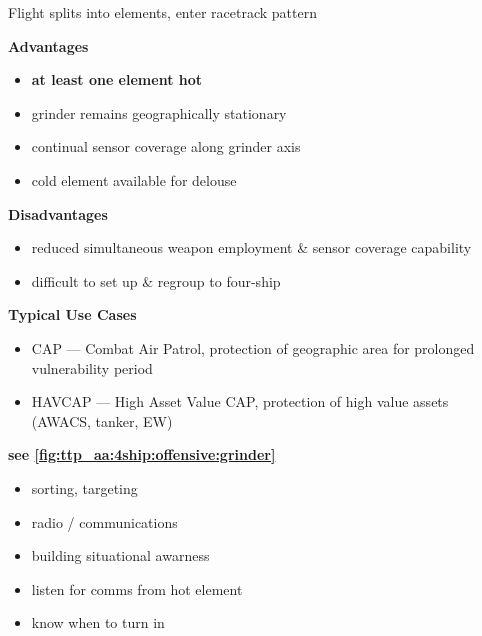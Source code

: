 
\clearpage

\begin{tcoloritemize}
    \blueitem[Grinder]
    Flight splits into elements, enter racetrack pattern

    \bigskip
    \textbf{Advantages}
    \begin{itemize}
        \item \textbf{at least one element hot}
        \item grinder remains geographically stationary
        \item continual sensor coverage along grinder axis
        \item cold element available for delouse
    \end{itemize}

    \textbf{Disadvantages}
    \begin{itemize}
        \item reduced simultaneous weapon employment \& sensor coverage capability
        \item difficult to set up \& regroup to four-ship
    \end{itemize}

    \textbf{Typical Use Cases} 
    \begin{itemize}
        \item CAP --- Combat Air Patrol, protection of geographic area for prolonged vulnerability period
        \item HAVCAP --- High Asset Value CAP, protection of high value assets (AWACS, tanker, EW)
    \end{itemize}
    
    \hfill\textbf{see \cref{fig:ttp_aa:4ship:offensive:grinder}}

    \begin{itemize}
        \item sorting, targeting
        \item radio / communications
    \end{itemize}

    \begin{itemize}
        \item building situational awarness
        \item listen for comms from hot element
        \item know when to turn in
    \end{itemize}
\end{tcoloritemize}

